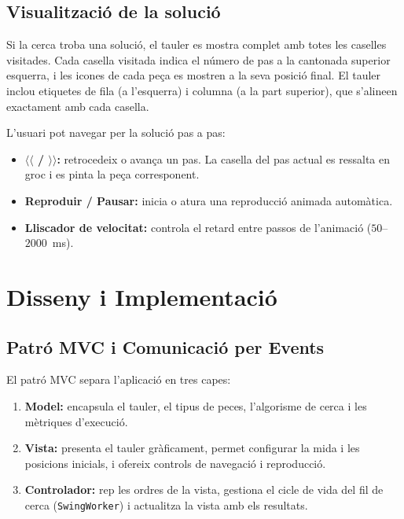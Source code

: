 \documentclass[conference,compsoc]{IEEEtran}
\begin{document}
\subsection{Visualització de la solució}

Si la cerca troba una solució, el tauler es mostra complet amb
totes les caselles visitades. Cada casella visitada indica el número
de pas a la cantonada superior esquerra, i les icones
de cada peça es mostren a la seva posició final. El tauler inclou
etiquetes de fila (a l'esquerra) i columna (a la part superior),
que s'alineen exactament amb cada casella.

L'usuari pot navegar per la solució pas a pas:

\begin{itemize}
    \item \textbf{$\langle\langle$ / $\rangle\rangle$:} retrocedeix o
          avança un pas. La casella del pas actual es ressalta en groc
          i es pinta la peça corresponent.
    \item \textbf{Reproduir / Pausar:} inicia o atura una reproducció
          animada automàtica.
    \item \textbf{Lliscador de velocitat:} controla el retard entre
          passos de l'animació ($50$--$2000$~ms).
\end{itemize}

\section{Disseny i Implementació}

\subsection{Patró MVC i Comunicació per Events}

El patró MVC separa l'aplicació en tres capes:

\begin{enumerate}
    \item \textbf{Model:} encapsula el tauler, el tipus de peces,
          l'algorisme de cerca i les mètriques d'execució.
    \item \textbf{Vista:} presenta el tauler gràficament, permet
          configurar la mida i les posicions inicials, i ofereix
          controls de navegació i reproducció.
    \item \textbf{Controlador:} rep les ordres de la vista, gestiona
          el cicle de vida del fil de cerca (\texttt{SwingWorker}) i
          actualitza la vista amb els resultats.
\end{enumerate}
\end{document}
